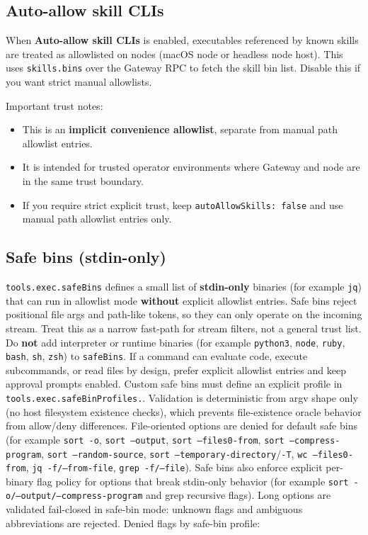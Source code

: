 \subsection{Auto-allow skill CLIs}


When \textbf{Auto-allow skill CLIs} is enabled, executables referenced by known skills
are treated as allowlisted on nodes (macOS node or headless node host). This uses
\texttt{skills.bins} over the Gateway RPC to fetch the skill bin list. Disable this if you want strict manual allowlists.

Important trust notes:

\begin{itemize}
  \item This is an \textbf{implicit convenience allowlist}, separate from manual path allowlist entries.
  \item It is intended for trusted operator environments where Gateway and node are in the same trust boundary.
  \item If you require strict explicit trust, keep \texttt{autoAllowSkills: false} and use manual path allowlist entries only.
\end{itemize}


\subsection{Safe bins (stdin-only)}


\texttt{tools.exec.safeBins} defines a small list of \textbf{stdin-only} binaries (for example \texttt{jq})
that can run in allowlist mode \textbf{without} explicit allowlist entries. Safe bins reject
positional file args and path-like tokens, so they can only operate on the incoming stream.
Treat this as a narrow fast-path for stream filters, not a general trust list.
Do \textbf{not} add interpreter or runtime binaries (for example \texttt{python3}, \texttt{node}, \texttt{ruby}, \texttt{bash}, \texttt{sh}, \texttt{zsh}) to \texttt{safeBins}.
If a command can evaluate code, execute subcommands, or read files by design, prefer explicit allowlist entries and keep approval prompts enabled.
Custom safe bins must define an explicit profile in \texttt{tools.exec.safeBinProfiles.}.
Validation is deterministic from argv shape only (no host filesystem existence checks), which
prevents file-existence oracle behavior from allow/deny differences.
File-oriented options are denied for default safe bins (for example \texttt{sort -o}, \texttt{sort --output},
\texttt{sort --files0-from}, \texttt{sort --compress-program}, \texttt{sort --random-source},
\texttt{sort --temporary-directory}/\texttt{-T}, \texttt{wc --files0-from}, \texttt{jq -f/--from-file},
\texttt{grep -f/--file}).
Safe bins also enforce explicit per-binary flag policy for options that break stdin-only
behavior (for example \texttt{sort -o/--output/--compress-program} and grep recursive flags).
Long options are validated fail-closed in safe-bin mode: unknown flags and ambiguous
abbreviations are rejected.
Denied flags by safe-bin profile:


